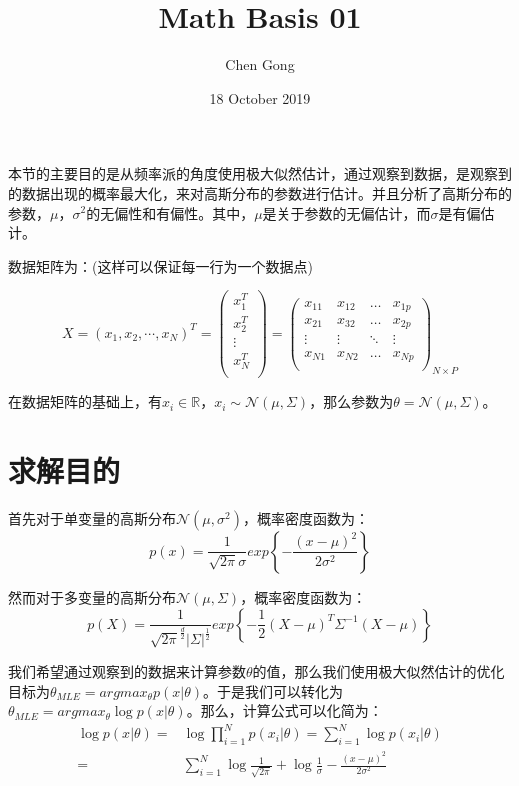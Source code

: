 \documentclass[a4paper]{article}
\title{Math Basis 01}
\author{Chen Gong}
\date{18 October 2019}
\begin{document}
\maketitle

本节的主要目的是从频率派的角度使用极大似然估计，通过观察到数据，是观察到的数据出现的概率最大化，来对高斯分布的参数进行估计。并且分析了高斯分布的参数，$\mu$，$\sigma^2$的无偏性和有偏性。其中，$\mu$是关于参数的无偏估计，而$\sigma$是有偏估计。

数据矩阵为：(这样可以保证每一行为一个数据点)

\begin{equation}
    X=(x_1, x_2, \cdots, x_N)^T=
    \begin{pmatrix}
    x_1^T \\ 
    x_2^T \\
    \vdots\\
    x_N^T \\
    \end{pmatrix} =
    \begin{pmatrix}
    x_{11} & x_{12} & \dots & x_{1p}\\
    x_{21} & x_{32} & \dots & x_{2p}\\
    \vdots & \vdots & \ddots & \vdots\\
    x_{N1} & x_{N2} & \dots & x_{Np}\\
    \end{pmatrix}_{N\times P}
\end{equation}

在数据矩阵的基础上，有$x_i \in \mathbb{R}$，$x_i \sim \mathcal{N}(\mu, \Sigma)$，那么参数为$\theta=\mathcal{N}(\mu, \Sigma)$。

\section{求解目的}
首先对于单变量的高斯分布$\mathcal{N}(\mu,\sigma^2)$，概率密度函数为：
\begin{equation}
    p(x)=\frac{1}{\sqrt{2\pi}\sigma}exp\left\{ -\frac{(x-\mu)^2}{2\sigma^2} \right\}
\end{equation}

然而对于多变量的高斯分布$\mathcal{N}(\mu,\Sigma)$，概率密度函数为：
\begin{equation}
    p(X)=\frac{1}{\sqrt{2\pi}^{\frac{d}{2}}|\Sigma|^{\frac{1}{2}}}exp\left\{ -\frac{1}{2}(X-\mu)^T\Sigma^{-1}(X-\mu) \right\}
\end{equation}

我们希望通过观察到的数据来计算参数$\theta$的值，那么我们使用极大似然估计的优化目标为$\theta_{MLE}=argmax_{\theta}p(x|\theta)$。于是我们可以转化为$\theta_{MLE}=argmax_{\theta}\log p(x|\theta)$。那么，计算公式可以化简为：
\begin{align}
    \log p(x|\theta) = & \log \prod_{i=1}^N p(x_i|\theta)=\sum_{i=1}^N \log p(x_i|\theta) \\
    = & \sum_{i=1}^N \log \frac{1}{\sqrt{2\pi}} + \log \frac{1}{\sigma} - \frac{(x-\mu)^2}{2\sigma^2} 
\end{align}
\end{document}

